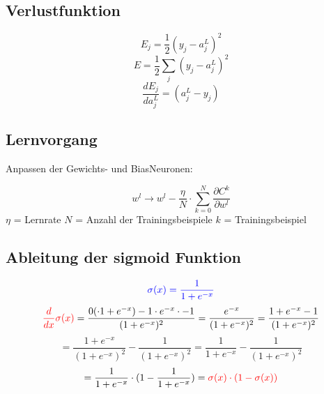 \documentclass{article}
\begin{document}
\subsection{Verlustfunktion}
\[ E_j = \frac{1}{2}(y_j - a_j^L)^2 \]
\[ E = \frac{1}{2}\sum_{j}^{} (y_j - a_j^L)^2 \]
\[ \frac{dE_j}{da_{j}^L}  = (a_j^L - y_j) \]


\subsection{Lernvorgang}
Anpassen der Gewichts- und BiasNeuronen:

\[ w^l \rightarrow w^l - \frac{\eta}{N} \cdot \sum_{k = 0}^{N} \frac{\partial C^k}{\partial w^l} \]
$\eta$ = Lernrate \kern 20pt $N$ = Anzahl der Trainingsbeispiele \kern 20pt $k$ = Trainingsbeispiel 


\subsection{Ableitung der sigmoid Funktion}
\[ \textcolor{blue}{ \sigma(x) = \frac{1}{1 + e^{-x}} } \]
\[ \textcolor{red}{ \frac{d}{dx}\sigma(x) } = \frac{
0( \cdot 1 + e^{-x}) - 1 \cdot e^{-x} \cdot -1
}{
    (1 + e^{-x})^2
} = \frac{e^{-x}}{(1 + e^{-x})^2} 
= \frac{1 + e^{-x} - 1}{(1 + e^{-x})^2} \]
\[ =\frac{1 + e^{-x}}{(1 + e^{-x})^2} - \frac{1}{(1 + e^{-x})^2} 
= \frac{1}{1 + e^{-x}} - \frac{1}{(1 + e^{-x})^2} \]
\[ = \frac{1}{1 + e^{-x}} \cdot (1 - \frac{1}{1 + e^{-x}}) 
= \textcolor{red}{ \sigma(x) \cdot (1 - \sigma(x)) } \]


\pagebreak
\end{document}
